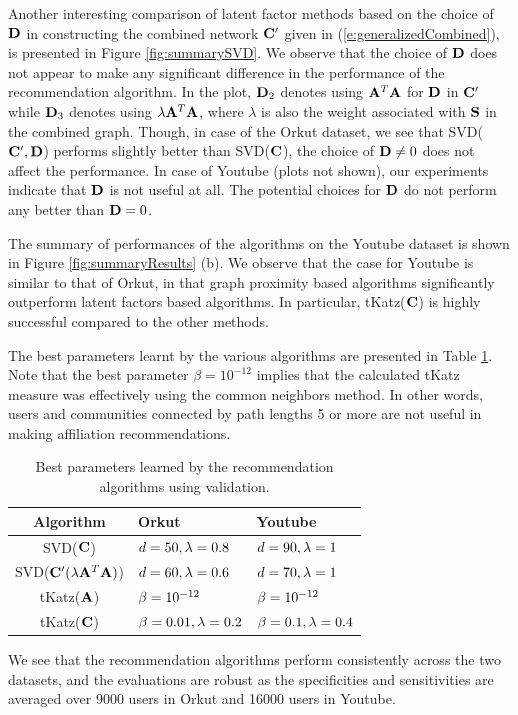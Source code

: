 Another interesting comparison of latent factor methods based on the choice of $\mathbf{D}$ in constructing the combined network $\mathbf{C}'$ given in (\ref{e:generalizedCombined}), is presented in Figure \ref{fig:summarySVD}. We observe that the choice of $\mathbf{D}$ does not appear to make any significant difference in the performance of the recommendation algorithm. In the plot, $\mathbf{D}_2$ denotes using $\mathbf{A}^{T}\mathbf{A}$ for $\mathbf{D}$ in $\mathbf{C}'$  while $\mathbf{D}_3$ denotes using $\lambda \mathbf{A}^{T}\mathbf{A}$, where $\lambda$ is also the weight associated with $\mathbf{S}$ in the combined graph. Though, in case of the Orkut dataset, we see that SVD($\mathbf{C}', \mathbf{D}$) performs slightly better than SVD($\mathbf{C}$), the choice of $\mathbf{D} \neq 0$ does not affect the performance. In case of Youtube (plots not shown), our experiments indicate that $\mathbf{D}$ is not useful at all. The potential choices for $\mathbf{D}$ do not perform any better than $\mathbf{D} = 0$.

The summary of performances of the algorithms on the Youtube dataset is shown in Figure \ref{fig:summaryResults} (b). We observe that the case for Youtube is similar to that of Orkut, in that graph proximity based algorithms significantly outperform latent factors based algorithms. In particular, tKatz($\mathbf{C}$) is highly successful compared to the other methods. 

The best parameters learnt by the various algorithms are presented in Table \ref{tab:parameters}. Note that the best parameter $\beta = 10^{-12}$ implies that the calculated tKatz measure was effectively using the common neighbors method. In other words, users and communities connected by path lengths 5 or more are not useful in making affiliation recommendations.

\begin{table}[h!]
\centering
\begin{tabular}{| c | p{2.4cm} | p{2.4cm} |} \hline
Algorithm&Orkut&Youtube\\ \hline
SVD($\mathbf{C}$) & $d=50, \lambda = 0.8$ & $d = 90, \lambda = 1$ \\ \hline
SVD($\mathbf{C}'(\lambda \mathbf{A}^{T} \mathbf{A})$) & $d = 60, \lambda = 0.6$ & $d = 70, \lambda = 1$ \\ \hline
tKatz($\mathbf{A}$) & $\beta = 10^{-12}$ & $\beta = 10^{-12}$ \\ \hline
tKatz($\mathbf{C}$) & $\beta = 0.01, \lambda = 0.2$ & $\beta = 0.1, \lambda = 0.4$ \\ \hline
\end{tabular}
\caption{Best parameters learned by the recommendation algorithms using validation.}
\label{tab:parameters}
\end{table}

We see that the recommendation algorithms perform consistently across the two datasets, and the evaluations are robust as the specificities and sensitivities are averaged over 9000 users in Orkut and 16000 users in Youtube.
